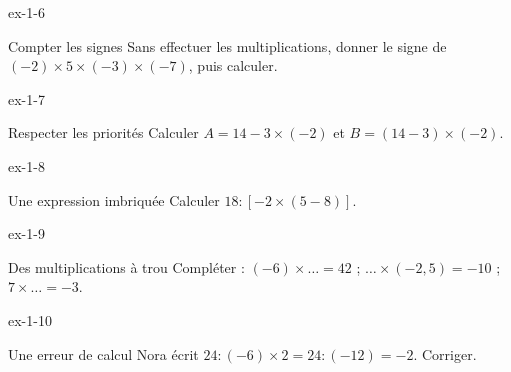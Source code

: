 \begin{blocLivre}{ex-1-6}\begin{exercice}[2]{Compter les signes}
Sans effectuer les multiplications, donner le signe de $(-2)\times5\times(-3)\times(-7)$, puis calculer.
\end{exercice}\end{blocLivre}
\begin{blocLivre}{ex-1-7}\begin{exercice}[2]{Respecter les priorités}
Calculer $A=14-3\times(-2)$ et $B=(14-3)\times(-2)$.
\end{exercice}\end{blocLivre}
\begin{blocLivre}{ex-1-8}\begin{exercice}[2]{Une expression imbriquée}
Calculer $18:[-2\times(5-8)]$.
\end{exercice}\end{blocLivre}
\begin{blocLivre}{ex-1-9}\begin{exercice}[2]{Des multiplications à trou}
Compléter : $(-6)\times\ldots=42$ ; $\ldots\times(-2{,}5)=-10$ ; $7\times\ldots=-3$.
\end{exercice}\end{blocLivre}
\begin{blocLivre}{ex-1-10}\begin{exercice}[2]{Une erreur de calcul}
Nora écrit $24:(-6)\times2=24:(-12)=-2$. Corriger.
\end{exercice}\end{blocLivre}

